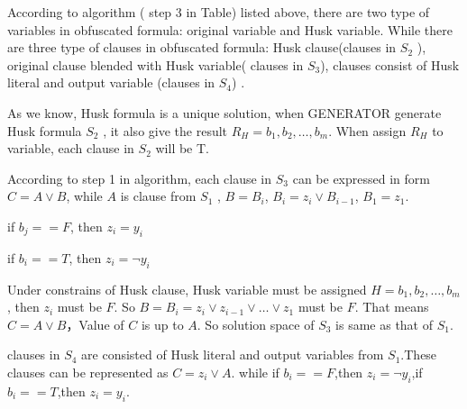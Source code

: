 \documentclass[runningheads,a4paper]{llncs}
\begin{document}
According to algorithm ( step 3 in Table) listed above, there are two type of variables in obfuscated formula: original variable and Husk variable. 
While there are three type of clauses in obfuscated formula: Husk clause(clauses in $S_2$ ),
original clause blended with Husk variable( clauses in $S_3$),
clauses consist of Husk literal and output variable (clauses in $S_4$) .

As we know, Husk formula is a unique solution, when GENERATOR generate Husk formula $S_2$ , it also give the result $R_H={b_1,b_2,\dots,b_m}$. When assign $R_H$ to variable, each clause in $S_2$ will be T.

According to step 1 in algorithm, each clause in $S_3$ can be expressed in form $C=A\vee B$, while $A$ is clause from $S_1$ , $B=B_i$, $B_i=z_i\vee B_{i-1}$, $B_1= z_1$.

if $b_j==F$, then $z_i =y_i$

if $b_i==T$, then $z_i = \neg y_i$

Under constrains of Husk clause, Husk variable must be assigned $H={b_1,b_2,\dots,b_m}$, then $z_i$ must be $F$. So $B=B_i=z_i\vee z_{i-1}\vee\dots\vee z_1$ must be $F$. 
That means $C=A\vee B$，Value of $C$ is up to $A$. So solution space of $S_3$ is same as that of $S_1$.


% 
% 
% 
% 
% 
% 
% 
% 
% 
% 
% 
% 
% 

clauses in $S_4$ are consisted of Husk literal and output variables from $S_1$.These clauses can be represented as $C= z_i\vee A$. while if $b_i==F$,then $z_i= \neg y_i$,if $b_i ==T$,then $z_i =y_i$.
\end{document}
